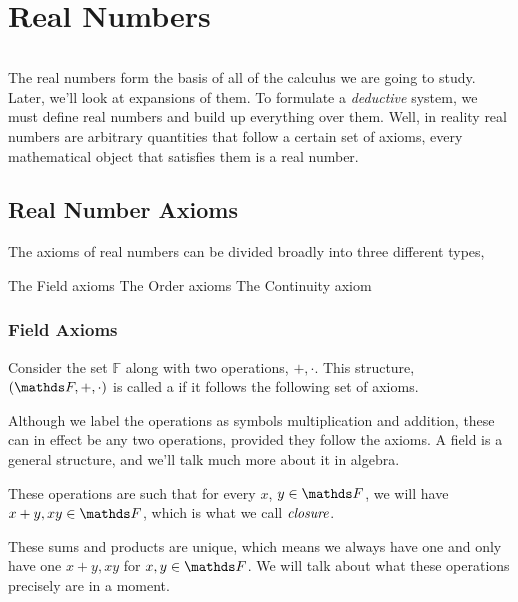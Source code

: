 \chapter{Real Numbers}


\begin{equation*}
\end{equation*}

The real numbers form the basis of all of the calculus we are going to study. Later, we'll look at expansions of them.
To formulate a \emph{deductive} system, we must define real numbers and build up everything over them. Well, in reality
real numbers are arbitrary quantities that follow a certain set of axioms, every mathematical object that satisfies
them is a real number.

\section{Real Number Axioms}

The axioms of real numbers can be divided broadly into three different types,

\begin{itemize}
    \ii The Field axioms
    \ii The Order axioms
    \ii The Continuity axiom
\end{itemize}

\subsection{Field Axioms}

Consider the set \(\mathbb{F}\) along with two operations, \(+, \cdot\).
This structure, \((\FF, +, \cdot)\) is called a  if it follows the following
set of axioms.

Although we label the operations as symbols multiplication and addition, these can in effect be 
any two operations, provided they follow the axioms. A field is a general structure, 
and we'll talk much more about it in algebra.

These operations are such that for every \(x\), \(y \in \FF\), we will have \(x + y, xy \in \FF\),
which is what we call \(\emph{closure}\).

These sums and products are unique, which means we always have one and only have one 
\(x+y, xy\) for \(x, y \in \FF\). We will talk about what these operations precisely are in 
a moment.

